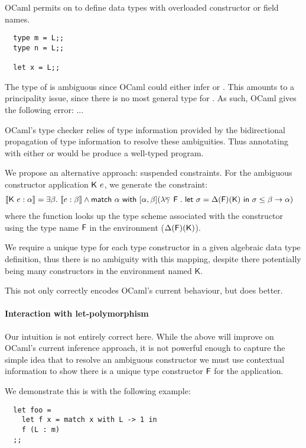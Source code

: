 \documentclass[acmsmall,screen,nonacm]{acmart}
\begin{document}
OCaml permits on to define data types with overloaded constructor or field names. 
\begin{lstlisting}
  type m = L;;
  type n = L;;

  let x = L;;
\end{lstlisting}
The type of  is ambiguous since OCaml could either infer  or . This amounts to a principality issue, 
since there is no most general type for . As such, OCaml gives the following error: ... 

OCaml's type checker relies of type information provided by the bidirectional propagation of type information
to resolve these ambiguities. Thus annotating  with either  or  would be produce a well-typed 
program. 

We propose an alternative approach: suspended constraints. For the ambiguous constructor application $\mathsf{K} ~ e$, 
we generate the constraint: 
\begin{align*}
 \llbracket \mathsf{K} ~ e : \alpha \rrbracket &= \exists {\beta}. ~ \llbracket e : \beta \rrbracket \wedge \mathsf{match} ~ \alpha ~ \mathsf{with} ~ [ \alpha, \beta ] (\lambda \overline{\gamma} \mathop{}\mathrel{\mathsf{F}}. ~ \mathsf{let} ~ \sigma = \Delta(\mathsf{F})(\mathsf{K}) ~ \mathsf{in} ~ \sigma \leq \beta \to \alpha )
\end{align*}
where the function looks up the type scheme associated with the constructor using the type name $\mathsf{F}$ in the environment ($\Delta(\mathsf{F})(\mathsf{K})$). 

We require a unique type for each type constructor in a given algebraic data type definition, thus there is no ambiguity with this mapping, despite 
there potentially being many constructors in the environment named $\mathsf{K}$. 

This not only correctly encodes OCaml's current behaviour, but does better. 


\paragraph{Interaction with let-polymorphism} Our intuition is not entirely correct here. While the above will 
improve on OCaml's current inference approach, it is not powerful enough to capture the simple idea that to resolve 
an ambiguous constructor we must use contextual information to show there is a unique type constructor $\mathsf{F}$ for the application. 

We demonstrate this is with the following example: 
\begin{lstlisting}
  let foo = 
    let f x = match x with L -> 1 in 
    f (L : m)
  ;; 
\end{lstlisting}
\end{document}
